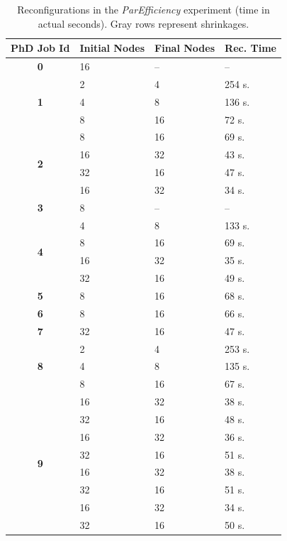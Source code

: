 \documentclass[a4paper,fleqn]{cas-dc}
\begin{document}
\begin{table}
\caption{Reconfigurations in the \textit{ParEfficiency} experiment (time in actual seconds). Gray rows represent shrinkages.}
\label{tab:reconfig_pairs}
\begin{tabular}{clll}
\toprule
\textbf{PhD Job Id}& \textbf{Initial Nodes} & \textbf{Final Nodes} & \textbf{Rec. Time} \\
\midrule
 \multirow{1}{*}{\textbf{0}} 
            & 16 & -- & -- \\
\midrule
 \multirow{3}{*}{\textbf{1}} 
            & 2 & 4 & 254 s. \\
            & 4 & 8 & 136 s.\\
            & 8 & 16 & 72 s.\\
\midrule
 \multirow{4}{*}{\textbf{2}} 
            & 8 & 16 & 69 s.\\
            & 16 & 32 & 43 s.\\
            & \cellcolor{lightgray}32 & \cellcolor{lightgray}16 & \cellcolor{lightgray}47 s.\\
            & 16 & 32 & 34 s.\\
\midrule
 \multirow{1}{*}{\textbf{3}} 
            & 8 & -- & -- \\
\midrule
 \multirow{4}{*}{\textbf{4}} 
            & 4 & 8 & 133 s.\\
            & 8 & 16 & 69 s.\\
            & 16 & 32 & 35 s.\\
            & \cellcolor{lightgray}32 & \cellcolor{lightgray}16 & \cellcolor{lightgray}49 s.\\
\midrule
 \multirow{1}{*}{\textbf{5}} 
            & 8 & 16 & 68 s.\\
\midrule
\multirow{1}{*}{\textbf{6}} 
            & 8 & 16 & 66 s.\\
\midrule
\multirow{1}{*}{\textbf{7}} 
            & \cellcolor{lightgray}32 & \cellcolor{lightgray}16 & \cellcolor{lightgray}47 s.\\
\midrule
\multirow{3}{*}{\textbf{8}} 
                & 2 & 4 & 253 s.\\
                & 4 & 8 & 135 s.\\
                & 8 & 16 & 67 s.\\
\midrule
 \multirow{8}{*}{\textbf{9}} 
            & 16 & 32 & 38 s.\\
            & \cellcolor{lightgray}32 & \cellcolor{lightgray}16 & \cellcolor{lightgray}48 s.\\
            & 16 & 32 & 36 s.\\
            & \cellcolor{lightgray}32 & \cellcolor{lightgray}16 & \cellcolor{lightgray}51 s.\\
            & 16 & 32 & 38 s.\\
            & \cellcolor{lightgray}32 & \cellcolor{lightgray}16 & \cellcolor{lightgray}51 s.\\
            & 16 & 32 & 34 s.\\
            & \cellcolor{lightgray}32 & \cellcolor{lightgray}16 & \cellcolor{lightgray}50 s.\\        
\bottomrule
\end{tabular}
\end{table}
\end{document}
